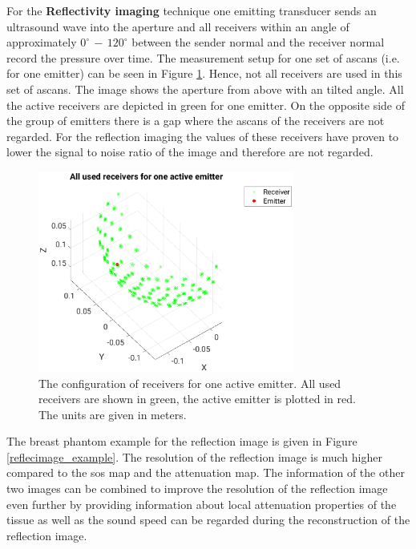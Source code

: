 For the \textbf{Reflectivity imaging} technique one emitting transducer sends an ultrasound wave into the aperture and all receivers within an angle of approximately $0^{\circ} \, - \, 120^{\circ}$ between the sender normal and the receiver normal record the pressure over time. The measurement setup for one set of \acp{ascan} (i.e. for one emitter) can be seen in Figure \ref{measurement_volume}. Hence, not all receivers are used in this set of \acp{ascan}. The image shows the aperture from above with an tilted angle. All the active receivers are depicted in green for one emitter. On the opposite side of the group of emitters there is a gap where the \acp{ascan} of the receivers are not regarded. For the reflection imaging the values of these receivers have proven to lower the signal to noise ratio of the image and therefore are not regarded.


\begin{figure}[H]
    \centering
    \includegraphics[width=0.75\textwidth]{Graphics/measurement_volume.eps}
    \caption{ The configuration of receivers for one active emitter. All used receivers are shown in green, the active emitter is plotted in red. The units are given in meters.}
    \label{measurement_volume}
\end{figure}

The breast phantom example for the reflection image is given in Figure \ref{reflecimage_example}. The resolution of the reflection image is much higher compared to the \ac{sos} map and the attenuation map. The information of the other two images can be combined to improve the resolution of the reflection image even further by providing information about local attenuation properties of the tissue as well as the sound speed can be regarded during the reconstruction of the reflection image.


